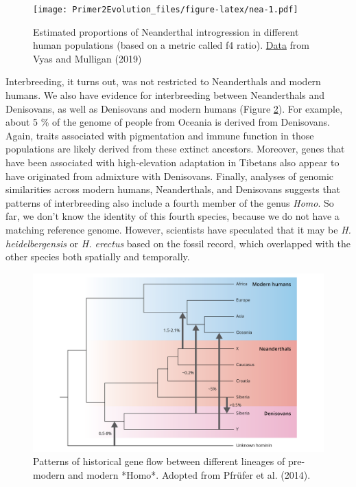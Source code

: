 \documentclass[
]{book}
\begin{document}
\begin{figure}
\centering
\texttt{[image: Primer2Evolution\_files/figure-latex/nea-1.pdf]}
\caption{\label{fig:nea}Estimated proportions of Neanderthal introgression in different human populations (based on a metric called f4 ratio). \href{data/14_neanderthal_introgression.csv}{Data} from Vyas and Mulligan (2019)}
\end{figure}

Interbreeding, it turns out, was not restricted to Neanderthals and modern humans. We also have evidence for interbreeding between Neanderthals and Denisovans, as well as Denisovans and modern humans (Figure \ref{fig:humanintro}). For example, about 5 \% of the genome of people from Oceania is derived from Denisovans. Again, traits associated with pigmentation and immune function in those populations are likely derived from these extinct ancestors. Moreover, genes that have been associated with high-elevation adaptation in Tibetans also appear to have originated from admixture with Denisovans. Finally, analyses of genomic similarities across modern humans, Neanderthals, and Denisovans suggests that patterns of interbreeding also include a fourth member of the genus \emph{Homo}. So far, we don't know the identity of this fourth species, because we do not have a matching reference genome. However, scientists have speculated that it may be \emph{H. heidelbergensis} or \emph{H. erectus} based on the fossil record, which overlapped with the other species both spatially and temporally.

\begin{figure}
\includegraphics[width=1\linewidth]{images/humanintroduction} \caption{Patterns of historical gene flow between different lineages of pre-modern and modern *Homo*. Adopted from Pfrüfer et al. (2014).}\label{fig:humanintro}
\end{figure}
\end{document}
